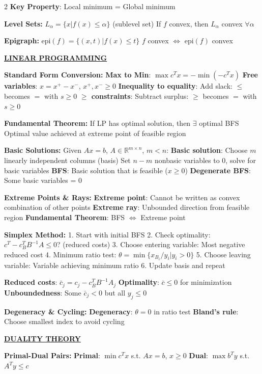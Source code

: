 \documentclass[8pt,a4paper,landscape]{article}
\newcommand{\mysection}[1]{\textbf{\underline{#1}}}
\newcommand{\mysubsection}[1]{\textbf{#1:}}
\begin{document}
\begin{multicols}{2}
\textbf{Key Property}: Local minimum = Global minimum

\mysubsection{Level Sets}
$L_\alpha = \{x | f(x) \leq \alpha\}$ (sublevel set)
If $f$ convex, then $L_\alpha$ convex $\forall \alpha$

\mysubsection{Epigraph}
$\text{epi}(f) = \{(x,t) | f(x) \leq t\}$
$f$ convex $\Leftrightarrow$ $\text{epi}(f)$ convex

\mysection{LINEAR PROGRAMMING}

\mysubsection{Standard Form Conversion}
\textbf{Max to Min}: $\max c^Tx = -\min(-c^Tx)$
\textbf{Free variables}: $x = x^+ - x^-$, $x^+, x^- \geq 0$
\textbf{Inequality to equality}: Add slack: $\leq$ becomes $= $ with $s \geq 0$
\textbf{$\geq$ constraints}: Subtract surplus: $\geq$ becomes $=$ with $s \geq 0$

\mysubsection{Fundamental Theorem}
If LP has optimal solution, then $\exists$ optimal BFS
Optimal value achieved at extreme point of feasible region

\mysubsection{Basic Solutions}
Given $Ax = b$, $A \in \mathbb{R}^{m \times n}$, $m < n$:
\textbf{Basic solution}: Choose $m$ linearly independent columns (basis)
Set $n-m$ nonbasic variables to 0, solve for basic variables
\textbf{BFS}: Basic solution that is feasible ($x \geq 0$)
\textbf{Degenerate BFS}: Some basic variables = 0

\mysubsection{Extreme Points \& Rays}
\textbf{Extreme point}: Cannot be written as convex combination of other points
\textbf{Extreme ray}: Unbounded direction from feasible region
\textbf{Fundamental Theorem}: BFS $\Leftrightarrow$ Extreme point

\mysubsection{Simplex Method}
1. Start with initial BFS
2. Check optimality: $c^T - c_B^TB^{-1}A \leq 0$? (reduced costs)
3. Choose entering variable: Most negative reduced cost
4. Minimum ratio test: $\theta = \min\{x_{B_i}/y_i | y_i > 0\}$
5. Choose leaving variable: Variable achieving minimum ratio
6. Update basis and repeat

\textbf{Reduced costs}: $\bar{c}_j = c_j - c_B^TB^{-1}A_j$
\textbf{Optimality}: $\bar{c} \leq 0$ for minimization
\textbf{Unboundedness}: Some $\bar{c}_j < 0$ but all $y_j \leq 0$

\mysubsection{Degeneracy \& Cycling}
\textbf{Degeneracy}: $\theta = 0$ in ratio test
\textbf{Bland's rule}: Choose smallest index to avoid cycling

\mysection{DUALITY THEORY}

\mysubsection{Primal-Dual Pairs}
\textbf{Primal}: $\min c^Tx$ s.t. $Ax = b$, $x \geq 0$
\textbf{Dual}: $\max b^Ty$ s.t. $A^Ty \leq c$


\end{multicols}
\end{document}
